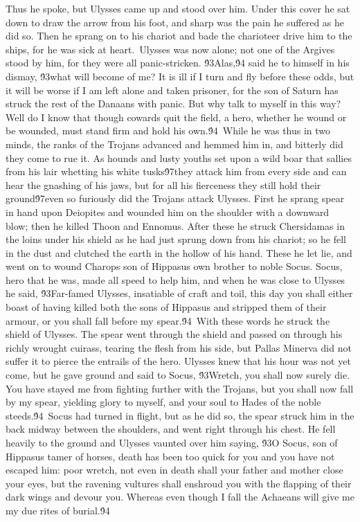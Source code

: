 {Thus he spoke, but Ulysses came up and stood over him. Under this cover he sat down to draw the arrow from his foot, and sharp was the pain he suffered as he did so. Then he sprang on to his chariot and bade the charioteer drive him to the ships, for he was sick at heart.\
Ulysses was now alone; not one of the Argives stood by him, for they were all panic-stricken. \'93Alas,\'94 said he to himself in his dismay, \'93what will become of me? It is ill if I turn and fly before these odds, but it will be worse if I am left alone and taken prisoner, for the son of Saturn has struck the rest of the Danaans with panic. But why talk to myself in this way? Well do I know that though cowards quit the field, a hero, whether he wound or be wounded, must stand firm and hold his own.\'94\
While he was thus in two minds, the ranks of the Trojans advanced and hemmed him in, and bitterly did they come to rue it. As hounds and lusty youths set upon a wild boar that sallies from his lair whetting his white tusks\'97they attack him from every side and can hear the gnashing of his jaws, but for all his fierceness they still hold their ground\'97even so furiously did the Trojans attack Ulysses. First he sprang spear in hand upon Deiopites and wounded him on the shoulder with a downward blow; then he killed Thoon and Ennomus. After these he struck Chersidamas in the loins under his shield as he had just sprung down from his chariot; so he fell in the dust and clutched the earth in the hollow of his hand. These he let lie, and went on to wound Charops son of Hippasus own brother to noble Socus. Socus, hero that he was, made all speed to help him, and when he was close to Ulysses he said, \'93Far-famed Ulysses, insatiable of craft and toil, this day you shall either boast of having killed both the sons of Hippasus and stripped them of their armour, or you shall fall before my spear.\'94\
With these words he struck the shield of Ulysses. The spear went through the shield and passed on through his richly wrought cuirass, tearing the flesh from his side, but Pallas Minerva did not suffer it to pierce the entrails of the hero. Ulysses knew that his hour was not yet come, but he gave ground and said to Socus, \'93Wretch, you shall now surely die. You have stayed me from fighting further with the Trojans, but you shall now fall by my spear, yielding glory to myself, and your soul to Hades of the noble steeds.\'94\
Socus had turned in flight, but as he did so, the spear struck him in the back midway between the shoulders, and went right through his chest. He fell heavily to the ground and Ulysses vaunted over him saying, \'93O Socus, son of Hippasus tamer of horses, death has been too quick for you and you have not escaped him: poor wretch, not even in death shall your father and mother close your eyes, but the ravening vultures shall enshroud you with the flapping of their dark wings and devour you. Whereas even though I fall the Achaeans will give me my due rites of burial.\'94\
}
